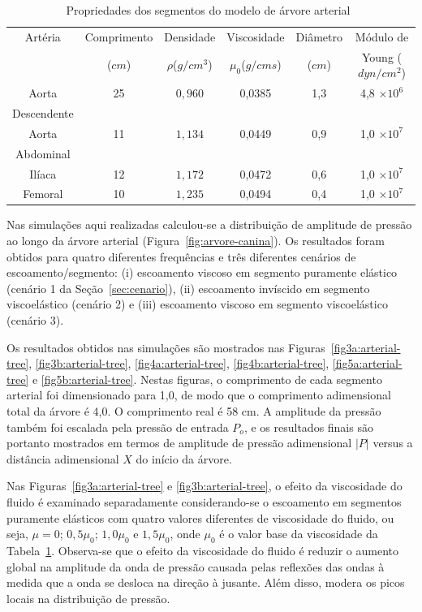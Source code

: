 \documentclass[
        english,			
        brazil			        %
        ,<...>]{abntbibufjf}
\begin{document}
\begin{table}[!htbp]
	\caption{Propriedades dos segmentos do modelo de árvore arterial~\cite{Duan,Fung}}
	\centering{}
	\begin{tabular}{|c||c|c|c|c|c|}
		\hline 
		Artéria	& Comprimento & Densidade & Viscosidade  & Diâmetro & Módulo de  \\ 
		& ($cm$) & $\rho$($g/cm^3$) & $\mu_0$($g/cm s$) & ($cm$) & Young ($dyn/cm^2$) \\ 
		\hline
		\hline 
		Aorta & 25 & $0,960$ & 0,0385 & 1,3 &4,8 $\times 10^6$ \\ 
		Descendente &  & &  & & \\ 
		\hline 
		Aorta & 11 & $1,134$ & 0,0449 & 0,9 & 1,0 $\times 10^7$ \\
		Abdominal &  & &  & &  \\ 
		\hline 
		Ilíaca & 12 & $1,172$ & 0,0472 & 0,6 & 1,0 $\times 10^7$\\ 
		\hline 
		Femoral & 10 & $1,235$ & 0,0494 & 0,4 & 1,0 $\times 10^7$\\ 
		\hline 
	\end{tabular} 
	\label{tab1:proprerty}
\end{table}

Nas simulações aqui realizadas calculou-se a distribuição de amplitude de pressão ao longo da árvore arterial (Figura~\ref{fig:arvore-canina}). Os resultados foram obtidos para quatro diferentes frequên\-cias e três diferentes cenários de escoamento/segmento: (i) escoamento viscoso em segmento puramente elástico (cenário 1 da Seção~\ref{sec:cenario}), (ii) escoamento invíscido em segmento viscoelástico (cenário 2) e (iii) escoamento viscoso em segmento viscoelástico (cenário 3). 

Os resultados obtidos nas simulações são mostrados nas Figuras~\ref{fig3a:arterial-tree}, \ref{fig3b:arterial-tree}, \ref{fig4a:arterial-tree}, \ref{fig4b:arterial-tree}, \ref{fig5a:arterial-tree} e \ref{fig5b:arterial-tree}. Nestas figuras, o comprimento de cada segmento arterial foi dimensionado para 1,0, de modo que o comprimento adimensional total da árvore é 4,0. O comprimento real é 58 cm. A amplitude da pressão também foi escalada pela pressão de entrada $P_o$, e os resultados finais são portanto mostrados em termos de amplitude de pressão adimensional $|P|$ versus a distância adimensional $X$ do início da árvore.

Nas Figuras~\ref{fig3a:arterial-tree} e \ref{fig3b:arterial-tree}, o efeito da viscosidade do fluido é examinado separadamente conside\-ran\-do-se o escoamento em segmentos puramente elásticos com quatro valores diferentes de viscosidade do fluido, ou seja, $\mu = 0$; $0,5 \mu_0$; $1,0 \mu_0$ e $1,5 \mu_0$, onde $\mu_0$ é o valor base da viscosidade da Tabela~\ref{tab1:proprerty}. Observa-se que o efeito da viscosidade do fluido é reduzir o aumento global na amplitude da onda de pressão causada pelas reflexões das ondas à medida que a onda se desloca na direção à jusante. Além disso, modera os picos locais na distribuição de pressão.
\end{document}
